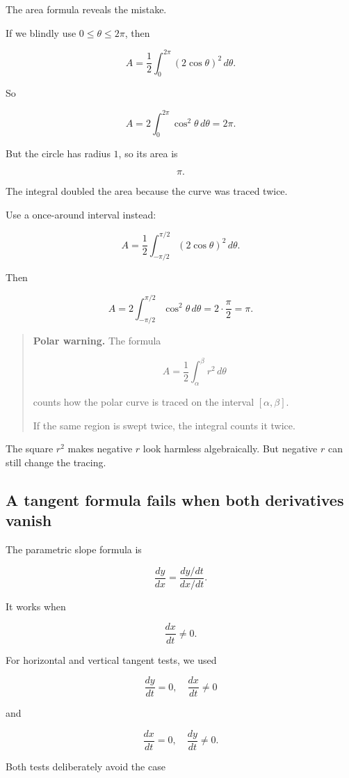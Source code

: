 The area formula reveals the mistake.

If we blindly use \(0\le\theta\le2\pi\), then

\[
A=
\frac12\int_0^{2\pi}(2\cos\theta)^2\,d\theta.
\]

So

\[
A
=
2\int_0^{2\pi}\cos^2\theta\,d\theta
=
2\pi.
\]

But the circle has radius \(1\), so its area is

\[
\pi.
\]

The integral doubled the area because the curve was traced twice.

Use a once-around interval instead:

\[
A=
\frac12\int_{-\pi/2}^{\pi/2}(2\cos\theta)^2\,d\theta.
\]

Then

\[
A=
2\int_{-\pi/2}^{\pi/2}\cos^2\theta\,d\theta
=
2\cdot\frac{\pi}{2}
=
\pi.
\]

\begin{quote}
\textbf{Polar warning.}
The formula

\[
A=\frac12\int_\alpha^\beta r^2\,d\theta
\]

counts how the polar curve is traced on the interval \([\alpha,\beta]\).

If the same region is swept twice, the integral counts it twice.
\end{quote}

The square \(r^2\) makes negative \(r\) look harmless algebraically.  But negative \(r\)
can still change the tracing.

\subsection{A tangent formula fails when both derivatives vanish}
\label{subsec:tangent-formula-fails-both-derivatives-zero}

The parametric slope formula is

\[
\frac{dy}{dx}
=
\frac{dy/dt}{dx/dt}.
\]

It works when

\[
\frac{dx}{dt}\neq0.
\]

For horizontal and vertical tangent tests, we used

\[
\frac{dy}{dt}=0,\quad \frac{dx}{dt}\neq0
\]

and

\[
\frac{dx}{dt}=0,\quad \frac{dy}{dt}\neq0.
\]

Both tests deliberately avoid the case

